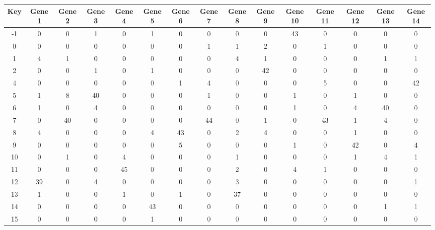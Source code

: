 \begin{tabular}{|c|c|c|c|c|c|c|c|c|c|c|c|c|c|c|}
\hline
Key & Gene 1 & Gene 2 & Gene 3 & Gene 4 & Gene 5 & Gene 6 & Gene 7 & Gene 8 & Gene 9 & Gene 10 & Gene 11 & Gene 12 & Gene 13 & Gene 14 \\
\hline
-1 & 0 & 0 & 1 & 0 & 1 & 0 & 0 & 0 & 0 & 43 & 0 & 0 & 0 & 0 \\
0 & 0 & 0 & 0 & 0 & 0 & 0 & 1 & 1 & 2 & 0 & 1 & 0 & 0 & 0 \\
1 & 4 & 1 & 0 & 0 & 0 & 0 & 0 & 4 & 1 & 0 & 0 & 0 & 1 & 1 \\
2 & 0 & 0 & 1 & 0 & 1 & 0 & 0 & 0 & 42 & 0 & 0 & 0 & 0 & 0 \\
4 & 0 & 0 & 0 & 0 & 0 & 1 & 4 & 0 & 0 & 0 & 5 & 0 & 0 & 42 \\
5 & 1 & 8 & 40 & 0 & 0 & 0 & 1 & 0 & 0 & 1 & 0 & 1 & 0 & 0 \\
6 & 1 & 0 & 4 & 0 & 0 & 0 & 0 & 0 & 0 & 1 & 0 & 4 & 40 & 0 \\
7 & 0 & 40 & 0 & 0 & 0 & 0 & 44 & 0 & 1 & 0 & 43 & 1 & 4 & 0 \\
8 & 4 & 0 & 0 & 0 & 4 & 43 & 0 & 2 & 4 & 0 & 0 & 1 & 0 & 0 \\
9 & 0 & 0 & 0 & 0 & 0 & 5 & 0 & 0 & 0 & 1 & 0 & 42 & 0 & 4 \\
10 & 0 & 1 & 0 & 4 & 0 & 0 & 0 & 1 & 0 & 0 & 0 & 1 & 4 & 1 \\
11 & 0 & 0 & 0 & 45 & 0 & 0 & 0 & 2 & 0 & 4 & 1 & 0 & 0 & 0 \\
12 & 39 & 0 & 4 & 0 & 0 & 0 & 0 & 3 & 0 & 0 & 0 & 0 & 0 & 1 \\
13 & 1 & 0 & 0 & 1 & 0 & 1 & 0 & 37 & 0 & 0 & 0 & 0 & 0 & 0 \\
14 & 0 & 0 & 0 & 0 & 43 & 0 & 0 & 0 & 0 & 0 & 0 & 0 & 1 & 1 \\
15 & 0 & 0 & 0 & 0 & 1 & 0 & 0 & 0 & 0 & 0 & 0 & 0 & 0 & 0 \\
\hline
\end{tabular}